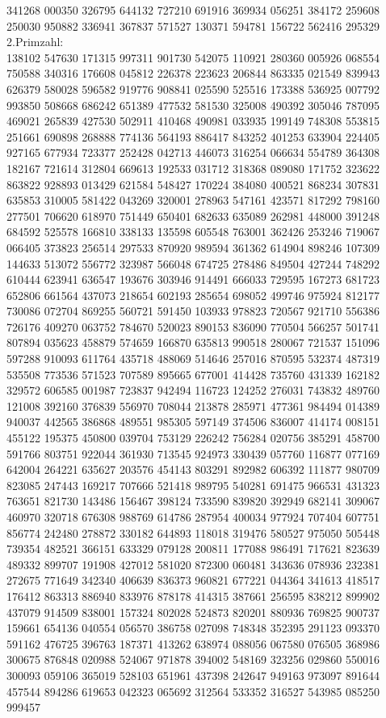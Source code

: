 341268 000350 326795 644132 727210 691916 369934 056251 384172 259608 250030 950882 336941 367837 571527 130371 594781 156722 562416 295329
\newpage
2.Primzahl:\\
138102 547630 171315 997311 901730 542075 110921 280360 005926 068554 750588 340316 176608 045812 226378 223623 206844 863335 021549 839943 626379 580028 596582 919776 908841 025590 525516 173388 536925 007792 993850 508668 686242 651389 477532 581530 325008 490392 305046 787095 469021 265839 427530 502911 410468 490981 033935 199149 748308 553815 251661 690898 268888 774136 564193 886417 843252 401253 633904 224405 927165 677934 723377 252428 042713 446073 316254 066634 554789 364308 182167 721614 312804 669613 192533 031712 318368 089080 171752 323622 863822 928893 013429 621584 548427 170224 384080 400521 868234 307831 635853 310005 581422 043269 320001 278963 547161 423571 817292 798160 277501 706620 618970 751449 650401 682633 635089 262981 448000 391248 684592 525578 166810 338133 135598 605548 763001 362426 253246 719067 066405 373823 256514 297533 870920 989594 361362 614904 898246 107309 144633 513072 556772 323987 566048 674725 278486 849504 427244 748292 610444 623941 636547 193676 303946 914491 666033 729595 167273 681723 652806 661564 437073 218654 602193 285654 698052 499746 975924 812177 730086 072704 869255 560721 591450 103933 978823 720567 921710 556386 726176 409270 063752 784670 520023 890153 836090 770504 566257 501741 807894 035623 458879 574659 166870 635813 990518 280067 721537 151096 597288 910093 611764 435718 488069 514646 257016 870595 532374 487319 535508 773536 571523 707589 895665 677001 414428 735760 431339 162182 329572 606585 001987 723837 942494 116723 124252 276031 743832 489760 121008 392160 376839 556970 708044 213878 285971 477361 984494 014389 940037 442565 386868 489551 985305 597149 374506 836007 414174 008151 455122 195375 450800 039704 753129 226242 756284 020756 385291 458700 591766 803751 922044 361930 713545 924973 330439 057760 116877 077169 642004 264221 635627 203576 454143 803291 892982 606392 111877 980709 823085 247443 169217 707666 521418 989795 540281 691475 966531 431323 763651 821730 143486 156467 398124 733590 839820 392949 682141 309067 460970 320718 676308 988769 614786 287954 400034 977924 707404 607751 856774 242480 278872 330182 644893 118018 319476 580527 975050 505448 739354 482521 366151 633329 079128 200811 177088 986491 717621 823639 489332 899707 191908 427012 581020 872300 060481 343636 078936 232381 272675 771649 342340 406639 836373 960821 677221 044364 341613 418517 176412 863313 886940 833976 878178 414315 387661 256595 838212 899902 437079 914509 838001 157324 802028 524873 820201 880936 769825 900737 159661 654136 040554 056570 386758 027098 748348 352395 291123 093370 591162 476725 396763 187371 413262 638974 088056 067580 076505 368986 300675 876848 020988 524067 971878 394002 548169 323256 029860 550016 300093 059106 365019 528103 651961 437398 242647 949163 973097 891644 457544 894286 619653 042323 065692 312564 533352 316527 543985 085250 999457
